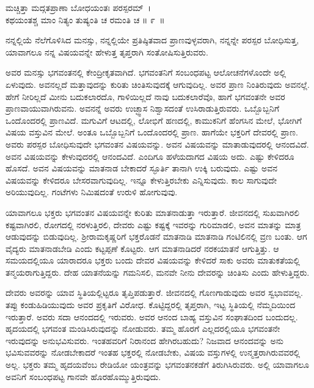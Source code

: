 \begin{shloka}
ಮಚ್ಚಿತ್ತಾ ಮದ್ಗತಪ್ರಾಣಾ ಬೋಧಯಂತಃ ಪರಸ್ಪರಮ್​~।\\ಕಥಯಂತಶ್ಚ ಮಾಂ ನಿತ್ಯಂ ತುಷ್ಯಂತಿ ಚ ರಮಂತಿ ಚ \hfill॥ ೯~॥
\end{shloka}

\begin{artha}
ನನ್ನಲ್ಲಿಯೆ ನೆಲೆಗೊಳಿಸಿದ ಮನಸ್ಸು, ನನ್ನಲ್ಲಿಯೇ ಪ್ರತಿಷ್ಠಿತವಾದ ಪ್ರಾಣವುಳ್ಳವರಾಗಿ, ನನ್ನನ್ನೇ ಪರಸ್ಪರ ಬೋಧಿಸುತ್ತ, ಯಾವಾಗಲೂ ನನ್ನ ವಿಷಯವನ್ನೇ ಹೇಳುತ್ತ ತೃಪ್ತರಾಗಿ ಸಂತೋಷಿಸುತ್ತಿರುವರು.
\end{artha}

ಅವರ ಮನಸ್ಸು ಭಗವಂತನಲ್ಲಿ ಕೇಂದ್ರೀಕೃತವಾಗಿದೆ. ಭಗವಂತನಿಗೆ ಸಂಬಂಧಪಟ್ಟ ಆಲೋ\-ಚನೆಗಳೊಂದೇ ಅಲ್ಲಿ ಏಳುವುದು. ಅವನಲ್ಲದೆ ಮತ್ತಾವುದನ್ನು ಕುರಿತು ಚಿಂತಿಸುವುದಕ್ಕೆ ಆಗುವುದಿಲ್ಲ. ಅವರ ಪ್ರಾಣ ನಿಂತಿರುವುದು ಅವನಲ್ಲೆ. ಹೇಗೆ ನೀರಿಲ್ಲದೆ ಮೀನು ಬದುಕಲಾರದೊ, ಗಾಳಿಯಿಲ್ಲದೆ ನಾವು ಬದುಕಲಾರೆವೊ, ಹಾಗೆ ಭಗವಂತನೇ ಅವರ ಪ್ರಾಣವಾಯುವಾಗಿರುವನು. ಅವನನ್ನೆ ಅವರು ಉಚ್ಛ್ವಾಸ ನಿಶ್ವಾಸದಂತೆ ಉಸಿರಾಡುತ್ತಿರುವರು. ಒಬ್ಬೊಬ್ಬನಿಗೆ ಒಂದೊಂದರಲ್ಲಿ ಪ್ರಾಣವಿದೆ. ಮಗುವಿಗೆ ಆಟದಲ್ಲಿ, ಲೋಭಿಗೆ ಹಣದಲ್ಲಿ, ಕಾಮುಕನಿಗೆ ಹೆಂಗಸಿನ ಮೇಲೆ, ಭೋಗಿಗೆ ವಿಷಯ ವಸ್ತುವಿನ ಮೇಲೆ. ಅಂತೂ ಒಬ್ಬೊಬ್ಬನಿಗೆ ಒಂದೊಂದರಲ್ಲಿ ಪ್ರಾಣ. ಹಾಗೆಯೇ ಭಕ್ತರಿಗೆ ದೇವರಲ್ಲಿ ಪ್ರಾಣ. ಅವರು ಪರಸ್ಪರ ಬೋಧಿಸುವುದೇ ಭಗವಂತನ ವಿಷಯವನ್ನು. ಅವನ ವಿಷಯವನ್ನು ಮಾತಾಡುವುದರಲ್ಲಿ ಆನಂದವಿದೆ. ಅವನ ವಿಷಯವನ್ನು ಕೇಳುವುದರಲ್ಲಿ ಆನಂದವಿದೆ. ಎಂದಿಗೂ ಹಳೆಯದಾಗದ ವಿಷಯ ಅದು. ಎಷ್ಟು ಕೇಳಿದರೂ ಹೊಸದೆ. ಅವನ ವಿಷಯವನ್ನು ಮಾತನಾಡ ಬೇಕಾದರೆ ಸ್ಫೂರ್ತಿ ತಾನಾಗಿ ಉಕ್ಕಿ ಬರುವುದು. ಎಷ್ಟು ಅವನ ವಿಷಯವನ್ನು ಕೇಳಿದರೂ ಬೇಸರವಾಗುವುದಿಲ್ಲ. ಇನ್ನೂ ಕೇಳುತ್ತಿರಬೇಕು ಎನ್ನಿಸುವುದು. ಕಾಲ ಸಾಗುವುದೇ ಅರಿಯುವುದಿಲ್ಲ. ಗಂಟೆಗಳು ನಿಮಿಷದಂತೆ ಉರುಳಿ ಹೋಗುವುವು.

ಯಾವಾಗಲೂ ಭಕ್ತರು ಭಗವಂತನ ವಿಷಯವನ್ನೇ ಕುರಿತು ಮಾತನಾಡುತ್ತಾ ಇರುತ್ತಾರೆ. ಜೀವನದಲ್ಲಿ ಸುಖವಾಗಿರಲಿ ಕಷ್ಟವಾಗಿರಲಿ, ರೋಗದಲ್ಲಿ ನರಳುತ್ತಿರಲಿ, ದೇವರು ಎಷ್ಟು ಕಷ್ಟಕ್ಕೆ ಇವರನ್ನು ಗುರಿಮಾಡಲಿ, ಅವನ ಮಾತನ್ನು ಮಾತ್ರ ಆಡುವುದನ್ನು ಬಿಡುವುದಿಲ್ಲ. ಶ‍್ರೀರಾಮಕೃಷ್ಣ\-ರಿಗೆ ಭಕ್ತರೊಡನೆ ಮಾತನಾಡಿ ಮಾತನಾಡಿ ಗಂಟಿಲಿನಲ್ಲಿ ವ್ರಣ  ಬಂತು. ಆಗ ವೈದ್ಯರು ಮಾತನಾಡಬೇಡಿ ಎಂದು ಕಟ್ಟಪ್ಪಣೆ ಕೊಟ್ಟರು. ಆಗ ಮಾತನಾಡಿದರೆ ನರಕಯಾತನೆ ಆಗುತ್ತಿತ್ತು. ಆ ಸಮಯದಲ್ಲಿಯೂ ಯಾರಾದರೂ ಭಕ್ತರು ಬಂದು ದೇವರ ವಿಷಯವನ್ನು ಕೇಳಿದರೆ ಸಾಕು ಅವರು ಮಾತುಕತೆಯಲ್ಲಿ ತನ್ಮಯರಾಗುತ್ತಿದ್ದರು. ದೇಹ ಯಾತನೆಯನ್ನು ಗಮನಿಸಲಿ, ಮನವೇ ನೀನು ದೇವರನ್ನು ಚಿಂತಿಸು ಎಂದು ಹೇಳುತ್ತಿದ್ದರು.

ದೇವರು ಅವರನ್ನು ಯಾವ ಸ್ಥಿತಿಯಲ್ಲಿಟ್ಟರೂ ತೃಪ್ತಿಪಡುತ್ತಾರೆ. ಜೀವನದಲ್ಲಿ ಗೊಣಗಾಡುವುದು ಅವರ ಸ್ವಭಾವವಲ್ಲ. ತಪ್ಪು ಕಂಡುಹಿಡಿಯುವುದು ಅವರ ಪ್ರಕೃತಿಗೆ ವಿರೋಧ. ಕೊಟ್ಟಿದ್ದರಲ್ಲಿ ತೃಪ್ತರಾಗಿ, ಇಟ್ಟ ಸ್ಥಿತಿಯಲ್ಲಿ ನೆಮ್ಮದಿಯಿಂದ ಇರುತ್ತಾರೆ. ಅವರು ಸದಾ ಆನಂದದಲ್ಲಿ ಇರುವರು. ಅವರ ಆನಂದ ಬಾಹ್ಯ ವಸ್ತುವಿನ ಸಂಘಾತದಿಂದ ಬಂದುದಲ್ಲ. ಹೃದಯದಲ್ಲಿ ಭಗವಂತ ಮಂಡಿಸಿರುವುದನ್ನು ನೋಡುವರು. ತಮ್ಮ ಹೊರಗೆ ಎಲ್ಲದರಲ್ಲಿಯೂ ಭಗವಂತನೇ ಇರುವುದನ್ನು ಅನುಭವಿಸುವರು. ಇಂತಹವರಿಗೆ ನಿರಾನಂದ ಹೇಗಿರಬಹುದು? ನಿಜವಾದ ಆನಂದವನ್ನು ಅನು ಭವಿಸುವವರನ್ನು ನೋಡಬೇಕಾದರೆ ಇಂತಹ ಭಕ್ತರಲ್ಲಿ ನೋಡಬೇಕು, ವಿಷಯ ವಸ್ತುಗಳಲ್ಲಿ ಉನ್ಮತ್ತರಾಗಿರುವವರಲ್ಲಿ ಅಲ್ಲ. ಭಕ್ತರು ತಮ್ಮ ಹೃದಯವೆಂಬ ರೇಡಿಯೋ ಯಂತ್ರವನ್ನು ಭಗವಂತನಕಡೆಗೆ ತಿರುಗಿಸಿರುವರು. ಅಲ್ಲಿ ಯಾವಾಗಲೂ ಅವನಿಗೆ ಸಂಬಂಧಪಟ್ಟ ಗಾನವೇ ಹೊರಹೊಮ್ಮುತ್ತಿರುವುದು.

